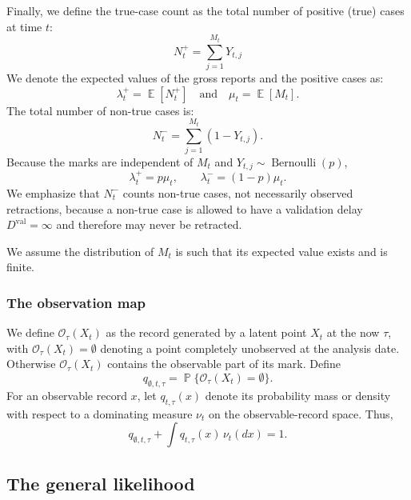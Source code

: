 \documentclass{article}
\theoremstyle{definition}
\theoremstyle{remark}
\newcommand{\E}{\operatorname{\mathbb{E}}}
\newcommand{\Prb}{\operatorname{\mathbb{P}}}
\begin{document}
Finally, we define the true-case count as the total number of positive (true) cases at time $t$:
\begin{equation}
    N_t^{+} = \sum\limits_{j = 1}^{M_t} Y_{t,j}
\end{equation}
We denote the expected values of the gross reports and the positive cases as:
\begin{equation}
    \lambda_t^{+} = \E[N_t^{+}] \quad \text{and} \quad  \mu_t = \E[M_t].
\end{equation}
The total number of non-true cases is:
\begin{equation}
    N_t^{-} =  \sum\limits_{j = 1}^{M_t} (1 - Y_{t,j}).
\end{equation}
Because the marks are independent of $M_t$ and $Y_{t,j}\sim\operatorname{Bernoulli}(p)$,
\begin{equation}
    \lambda_t^{+}=p\mu_t,
    \qquad
    \lambda_t^{-}=(1-p)\mu_t.
\end{equation}
We emphasize that $N_t^{-}$ counts non-true cases, not necessarily observed retractions, because a non-true case is allowed to have a validation delay $D^{\mathrm{val}}=\infty$ and therefore may never be retracted.

We assume the distribution of $M_t$ is such that its expected value exists and is finite. 


\subsubsection{The observation map}

We define $\mathcal{O}_{\tau}(X_t)$ as the record generated by a latent point $X_t$ at the now $\tau$, with $\mathcal{O}_{\tau}(X_t)=\emptyset$ denoting a point completely unobserved at the analysis date. Otherwise $\mathcal{O}_{\tau}(X_t)$ contains the observable part of its mark. Define
\begin{equation}
    q_{\emptyset,t,\tau}=\Prb\{\mathcal{O}_{\tau}(X_t)=\emptyset\}.
\end{equation}
For an observable record $x$, let $q_{t,\tau}(x)$ denote its probability mass or density with respect to a dominating measure $\nu_t$ on the observable-record space. Thus,
\begin{equation}
    q_{\emptyset,t,\tau}
    + \int q_{t,\tau}(x)\,\nu_t(dx)
    =1.
\end{equation}
\subsection{The general likelihood}
\end{document}
